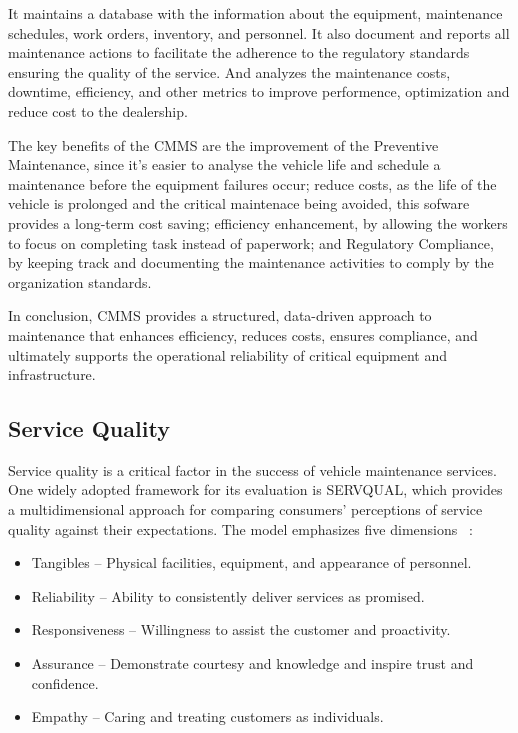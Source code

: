 It maintains a database with the information about the equipment, maintenance schedules, work orders, inventory, and personnel. 
It also document and reports all maintenance actions to facilitate the adherence to the regulatory standards ensuring the quality of the service. 
And analyzes the maintenance costs, downtime, efficiency, and other metrics to improve performence, optimization and reduce cost to the dealership.

The key benefits of the \ac{CMMS} are the improvement of the Preventive Maintenance, since it's easier to analyse the vehicle life and schedule a maintenance before the equipment failures occur; reduce costs, as the life of the vehicle is prolonged and the critical maintenace being avoided, this sofware provides a long-term cost saving; efficiency enhancement, by allowing the workers to focus on completing task instead of paperwork; and Regulatory Compliance, by keeping track and documenting the maintenance activities to comply by the organization standards. 

In conclusion, \ac{CMMS} provides a structured, data-driven approach to maintenance that enhances efficiency, reduces costs, ensures compliance, and ultimately supports the operational reliability of critical equipment and infrastructure.





\subsection{Service Quality}

Service quality is a critical factor in the success of vehicle maintenance services. One widely adopted framework for its evaluation is SERVQUAL, which provides a multidimensional approach for comparing consumers’ perceptions of service quality against their expectations. The model emphasizes five dimensions ~\cite{SERVQUAL_OLD}:


\begin{itemize}
   \item Tangibles – Physical facilities, equipment, and appearance of personnel.
   \item Reliability – Ability to consistently deliver services as promised.
   \item Responsiveness – Willingness to assist the customer and proactivity.
   \item Assurance – Demonstrate courtesy and knowledge and inspire trust and confidence.
   \item Empathy – Caring and treating customers as individuals.
  \end{itemize}

